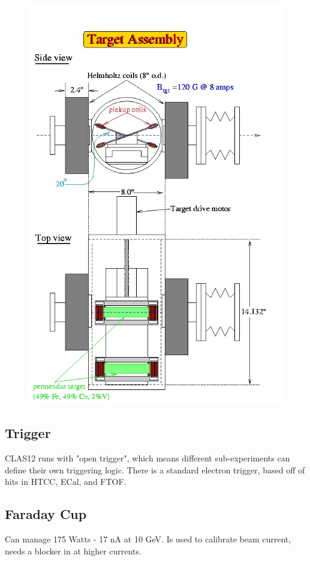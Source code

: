 			 \begin{figure}[H]
    			\centering
    			\includegraphics[width=12cm]{CLAS-12/modules/clas-12-system/pics/other/hall-b-poll-target.jpg}
    			\caption{ }
			\end{figure}
        \subsection{Trigger}
            CLAS12 runs with "open trigger", which means different sub-experiments can define their own triggering logic. There is a standard electron trigger, based off of hits in HTCC, ECal, and FTOF. 
  

        
        \subsection{Faraday Cup}
            Can manage 175 Watts - 17 nA at 10 GeV. Is used to calibrate beam current, needs a blocker in at higher currents.
            
